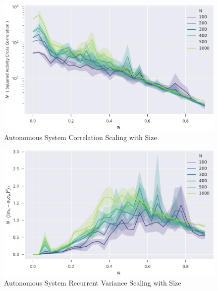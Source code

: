 \documentclass[10pt,a4paper]{article}
\begin{document}
	\begin{figure}[h]
		\includegraphics{../plots/homogeneous_independent_gaussian_input_corr_act_size_scaling_log.pdf}
		\caption{Autonomous System Correlation Scaling with Size}
	\end{figure}
	
	\begin{figure}[h]
		\includegraphics{../plots/homogeneous_independent_gaussian_input_rec_mem_pot_predict_size_scaling.pdf}
		\caption{Autonomous System Recurrent Variance Scaling with Size}
	\end{figure}
\end{document}
